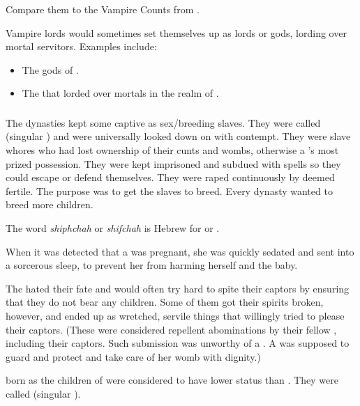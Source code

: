 Compare them to the Vampire Counts from \cite{RPG:Warhammer}. 

Vampire lords would sometimes set themselves up as lords or gods, lording over mortal servitors. 
Examples include:

\begin{itemize}
  \item 
    The gods of . 
  \item 
    The  that lorded over mortals in the realm of . 
\end{itemize}







\subsubsection[Yurideth]{\Yurideth}
\index{\yurid}
The \resphan{} dynasties kept some captive \resviel{} as sex/breeding slaves. 
They were called \yurideth{} (singular \yurid{}) and were universally looked down on with contempt. 
They were slave whores who had lost ownership of their cunts and wombs, otherwise a \resvil{}'s most prized possession.
They were kept imprisoned and subdued with spells so they could escape or defend themselves. 
They were raped continuously by \resphain{} deemed fertile. The purpose was to get the slaves to breed. 
Every dynasty wanted to breed more children. 

The word \emph{shiphchah} or \emph{shifchah} is Hebrew for  or . 

When it was detected that a \yurid{} was pregnant, she was quickly sedated and sent into a sorcerous sleep, to prevent her from harming herself and the baby. 

The \yurideth{} hated their fate and would often try hard to spite their captors by ensuring that they do not bear any children. Some of them got their spirits broken, however, and ended up as wretched, servile things that willingly tried to please their captors. 
(These were considered repellent abominations by their fellow \resphain{}, including their captors. Such submission was unworthy of a \resvil{}. A \resvil{} was supposed to guard and protect and take care of her womb with dignity.)

\Resphain{} born as the children of \yurideth{} were considered to have lower status than \thelyadeth. They were called  (singular ). 

